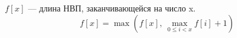 $f[x]$ --- длина НВП, заканчивающейся на число x. 
\[
f[x] = \max\left(f[x],\ \max\limits_{0 \le i < x} f[i] + 1\right)
\]